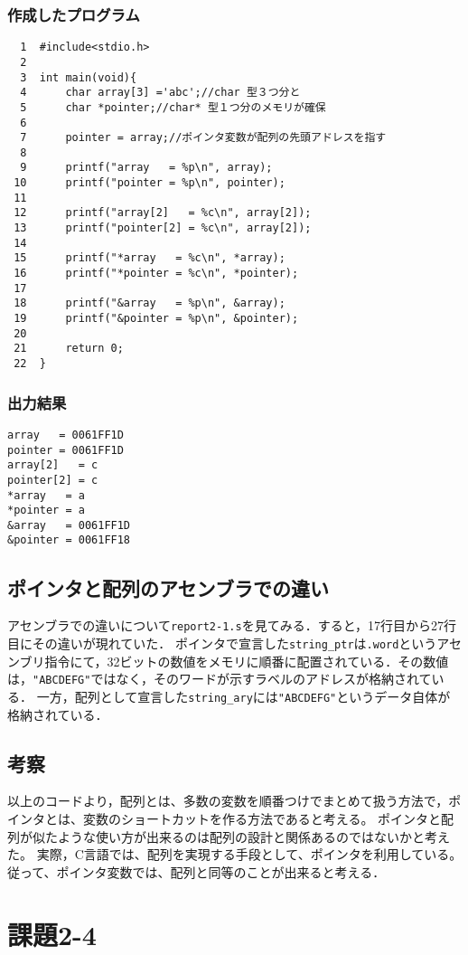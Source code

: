 \documentclass[a4j,11pt]{jarticle}
\begin{document}
\subsubsection{作成したプログラム}\label{sec:ptrary}
\begin{verbatim}
  1  #include<stdio.h>        
  2
  3  int main(void){
  4      char array[3] ='abc';//char 型３つ分と
  5      char *pointer;//char* 型１つ分のメモリが確保
  6
  7      pointer = array;//ポインタ変数が配列の先頭アドレスを指す
  8
  9      printf("array   = %p\n", array);
 10      printf("pointer = %p\n", pointer);
 11
 12      printf("array[2]   = %c\n", array[2]);
 13      printf("pointer[2] = %c\n", array[2]);
 14
 15      printf("*array   = %c\n", *array);
 16      printf("*pointer = %c\n", *pointer);
 17
 18      printf("&array   = %p\n", &array);
 19      printf("&pointer = %p\n", &pointer);
 20
 21      return 0;
 22  }
\end{verbatim}
\subsubsection{出力結果}
\begin{verbatim}
array   = 0061FF1D
pointer = 0061FF1D
array[2]   = c
pointer[2] = c
*array   = a
*pointer = a
&array   = 0061FF1D
&pointer = 0061FF18
\end{verbatim}
\subsection{ポインタと配列のアセンブラでの違い}
アセンブラでの違いについて\verb|report2-1.s|を見てみる．すると，17行目から27行目にその違いが現れていた．
ポインタで宣言した\verb|string_ptr|は\verb|.word|というアセンブリ指令にて，32ビットの数値をメモリに順番に配置されている．その数値は，\verb|"ABCDEFG"|ではなく，そのワードが示すラベルのアドレスが格納されている．
一方，配列として宣言した\verb|string_ary|には\verb|"ABCDEFG"|というデータ自体が格納されている．
\subsection{考察}
以上のコードより，配列とは、多数の変数を順番つけでまとめて扱う方法で，ポインタとは、変数のショートカットを作る方法であると考える。
ポインタと配列が似たような使い方が出来るのは配列の設計と関係あるのではないかと考えた。
実際，C言語では、配列を実現する手段として、ポインタを利用している。従って、ポインタ変数では、配列と同等のことが出来ると考える．
 \section{課題2-4}
\end{document}
